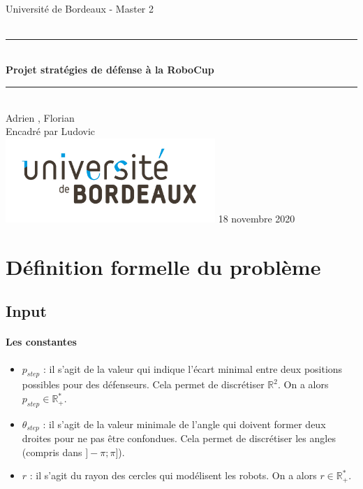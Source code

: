 \documentclass[12pt]{article}
\begin{document}
\begin{titlepage}
    ~ \vfill
    \begin{center}
      \LARGE  Université de Bordeaux - Master 2\\[1.5cm]

      {\Large \bfseries {}}\\[0.5cm]

      \rule{\linewidth}{0.5mm}\\[0.4cm] {\Huge \bfseries Projet stratégies de défense à la RoboCup \\[0.2cm]} \rule{\linewidth}{0.5mm}\\[1.5cm] {
      \Large Adrien , Florian }\\[0.5cm]

                {\large Encadré par Ludovic }\\ \vfill
                \includegraphics[width = 300px]{logo.jpg} \vfill
                                {\large 18 novembre 2020}
    \end{center}
\end{titlepage}

\section{Définition formelle du problème}

\subsection{Input}

\paragraph{Les constantes}

\begin{itemize}
  \item $p_{step}$ : il s'agit de la valeur qui indique l'écart minimal entre deux positions possibles pour des défenseurs. Cela permet de discrétiser $\mathbb{R}^2$. On a alors $p_{step} \in \mathbb{R}^*_+$.
  \item $\theta_{step}$ : il s'agit de la valeur minimale de l'angle qui doivent former deux droites pour ne pas être confondues. Cela permet de discrétiser les angles (compris dans $]-\pi ; \pi]$).
  \item $r$ : il s'agit du rayon des cercles qui modélisent les robots. On a alors $r \in \mathbb{R}^*_+$.
\end{itemize}
\end{document}
